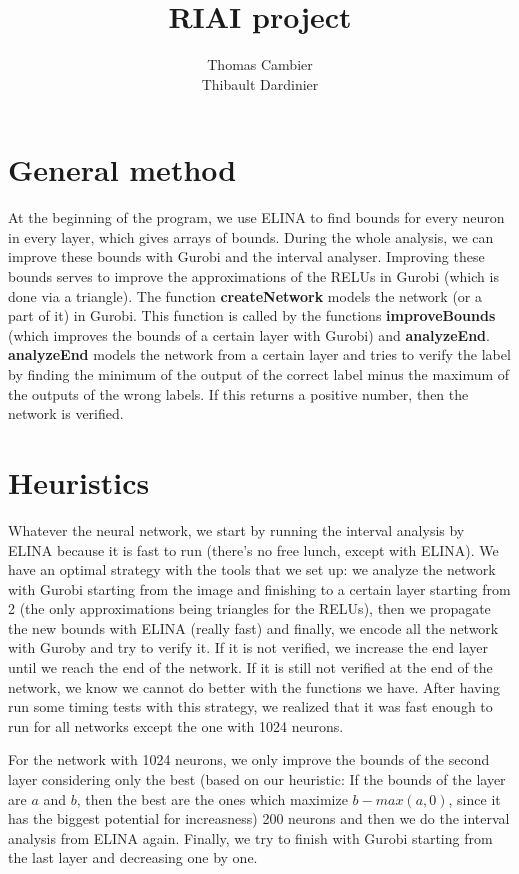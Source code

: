 \documentclass{article}
\begin{document}
\title{RIAI project}
\author{Thomas Cambier\\Thibault Dardinier}

\maketitle

\section{General method}

At the beginning of the program, we use ELINA to find bounds for every neuron in every layer, which gives arrays of bounds.
During the whole analysis, we can improve these bounds with Gurobi and the interval analyser.
Improving these bounds serves to improve the approximations of the RELUs in Gurobi (which is done via a triangle).
The function \textbf{createNetwork} models the network (or a part of it) in Gurobi.
This function is called by the functions \textbf{improveBounds} (which improves the bounds of a certain layer with Gurobi) and \textbf{analyzeEnd}.
\textbf{analyzeEnd} models the network from a certain layer and tries to verify the label by finding the minimum of the output of the correct label minus the maximum of the outputs of the wrong labels.
If this returns a positive number, then the network is verified.

\section{Heuristics}

Whatever the neural network, we start by running the interval analysis by ELINA because it is fast to run (there's no free lunch, except with ELINA). 
We have an optimal strategy with the tools that we set up: we analyze the network with Gurobi starting from the image and finishing to a certain layer starting from 2 (the only approximations being triangles for the RELUs), then we propagate the new bounds with ELINA (really fast) and finally, we encode all the network with Guroby and try to verify it.
If it is not verified, we increase the end layer until we reach the end of the network. 
If it is still not verified at the end of the network, we know we cannot do better with the functions we have.
After having run some timing tests with this strategy, we realized that it was fast enough to run for all networks except the one with 1024 neurons.

For the network with 1024 neurons, we only improve the bounds of the second layer considering only the best (based on our heuristic: If the bounds of the layer are $a$ and $b$, then the best are the ones which maximize $b - max(a, 0)$, since it has the biggest potential for increasness) 200 neurons and then we do the interval analysis from ELINA again. Finally, we try to finish with Gurobi starting from the last layer and decreasing one by one.
\end{document}

